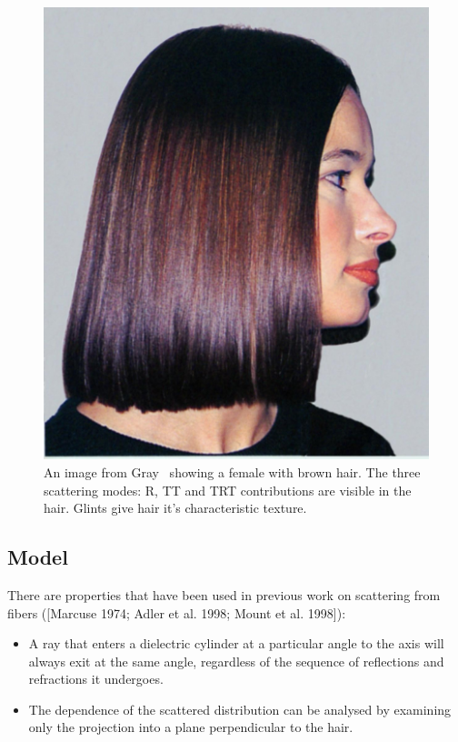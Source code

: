 \documentclass[11pt,a4paper]{report}
\begin{document}
\begin{figure}[h]
\begin{center}
\includegraphics[scale=0.2]{images/female_marschner.jpeg}
\caption{An image from Gray~\cite{gray} showing a female with brown hair. The three scattering modes: R, TT and TRT contributions are visible in the hair. Glints give hair it's characteristic texture.}
\label{female_hair}
\end{center}
\end{figure}

\subsection{Model}

There are properties that have been used in previous work on scattering from fibers ([Marcuse 1974; Adler et al. 1998; Mount et al. 1998]):

\begin{itemize}
\item A ray that enters a dielectric cylinder at a particular angle to the axis will always exit at the same angle, regardless of the sequence of reflections and refractions it undergoes.

\item The dependence of the scattered distribution can be analysed by examining only the projection into a plane perpendicular to the hair.
\end{itemize}
\end{document}
